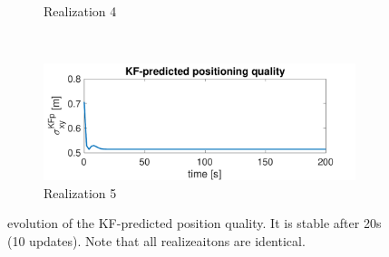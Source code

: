 \documentclass{article}
\begin{document}
\begin{figure}[H]
\begin{subfigure}[t]{0.49\textwidth}
        \caption{Realization 4}
    \end{subfigure}
    ~
    \begin{subfigure}[t]{0.49\textwidth}
        \centering
        \includegraphics[width=\textwidth]{5_sigma_KF}
        \caption{Realization 5}
    \end{subfigure}
    \caption{evolution of the KF-predicted position quality.
            It is stable after 20s (10 updates).
            Note that all realizeaitons are identical.}
    \label{fig:error_gyro}
\end{figure}
\end{document}

